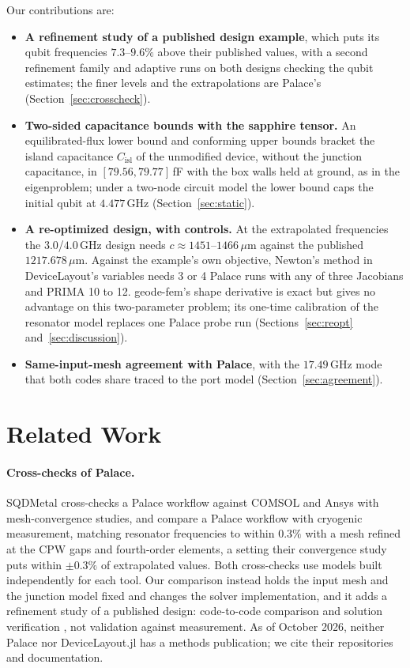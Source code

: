 \documentclass{anvil-paper}
\newcommand{\Cisl}{C_{\mathrm{isl}}}
\begin{document}
Our contributions are:
\begin{itemize}
  \item \textbf{A refinement study of a published design example}, which
    puts its qubit frequencies $7.3$--$9.6\%$ above their published values, with a
    second refinement family and adaptive runs on both designs checking
    the qubit estimates; the finer levels and the extrapolations are
    Palace's (Section~\ref{sec:crosscheck}).
  \item \textbf{Two-sided capacitance bounds with the sapphire tensor.}
    An equilibrated-flux lower bound and conforming upper bounds bracket
    the island capacitance $\Cisl$ of the unmodified device, without the
    junction capacitance, in $[79.56, 79.77]$\,fF with the box walls held
    at ground, as in the eigenproblem; under a two-node circuit model the
    lower bound caps the initial qubit at $4.477$\,GHz
    (Section~\ref{sec:static}).
  \item \textbf{A re-optimized design, with controls.} At the extrapolated
    frequencies the $3.0$/$4.0$\,GHz design needs $c \approx
    1451$--$1466\,\mu$m against the published $1217.678\,\mu$m. Against
    the example's own objective, Newton's method in DeviceLayout's
    variables needs 3 or 4 Palace runs with any of three Jacobians and
    PRIMA 10 to 12. geode-fem's shape derivative is exact but gives no
    advantage on this two-parameter problem; its one-time calibration of
    the resonator model replaces one Palace probe run
    (Sections~\ref{sec:reopt} and~\ref{sec:discussion}).
  \item \textbf{Same-input-mesh agreement with Palace}, with the
    $17.49$\,GHz mode that both codes share traced to the port model
    (Section~\ref{sec:agreement}).
\end{itemize}

\section{Related Work}
\label{sec:related}

\paragraph{Cross-checks of Palace.}
SQDMetal \citep{sommers2025open} cross-checks a Palace workflow against
COMSOL and Ansys with mesh-convergence studies, and
\citet{ye2025electromagnetic} compare a Palace workflow with cryogenic
measurement, matching resonator frequencies to within $0.3\%$ with a mesh
refined at the CPW gaps and fourth-order elements, a setting their
convergence study puts within $\pm0.3\%$ of extrapolated values. Both cross-checks use models built
independently for each tool. Our comparison instead holds the input mesh
and the junction model fixed and changes the solver implementation, and it
adds a refinement study of a published design: code-to-code comparison and
solution verification \citep{oberkampf2010verification}, not validation
against measurement. As of October 2026, neither Palace nor DeviceLayout.jl has a
methods publication; we cite their repositories and documentation.
\end{document}
